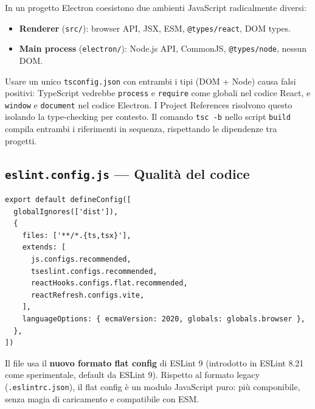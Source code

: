\documentclass[a4paper,12pt]{article}
\begin{document}
\begin{infobox}
In un progetto Electron coesistono due ambienti JavaScript radicalmente
diversi:
\begin{itemize}[noitemsep]
  \item \textbf{Renderer} (\texttt{src/}): browser API, JSX, ESM,
        \texttt{@types/react}, DOM types.
  \item \textbf{Main process} (\texttt{electron/}): Node.js API, CommonJS,
        \texttt{@types/node}, nessun DOM.
\end{itemize}
Usare un unico \texttt{tsconfig.json} con entrambi i tipi (DOM + Node)
causa falsi positivi: TypeScript vedrebbe \texttt{process} e
\texttt{require} come globali nel codice React, e \texttt{window}
e \texttt{document} nel codice Electron. I Project References risolvono
questo isolando la type-checking per contesto.
Il comando \texttt{tsc -b} nello script \texttt{build} compila
entrambi i riferimenti in sequenza, rispettando le dipendenze tra
progetti.
\end{infobox}

\subsection{\texttt{eslint.config.js} --- Qualit\`{a} del codice}

\begin{lstlisting}
export default defineConfig([
  globalIgnores(['dist']),
  {
    files: ['**/*.{ts,tsx}'],
    extends: [
      js.configs.recommended,
      tseslint.configs.recommended,
      reactHooks.configs.flat.recommended,
      reactRefresh.configs.vite,
    ],
    languageOptions: { ecmaVersion: 2020, globals: globals.browser },
  },
])
\end{lstlisting}

\noindent Il file usa il \textbf{nuovo formato flat config} di ESLint 9 (introdotto
in ESLint 8.21 come sperimentale, default da ESLint 9). Rispetto al
formato legacy (\texttt{.eslintrc.json}), il flat config \`{e} un modulo
JavaScript puro: pi\`{u} componibile, senza magia di caricamento e
compatibile con ESM.
\end{document}
